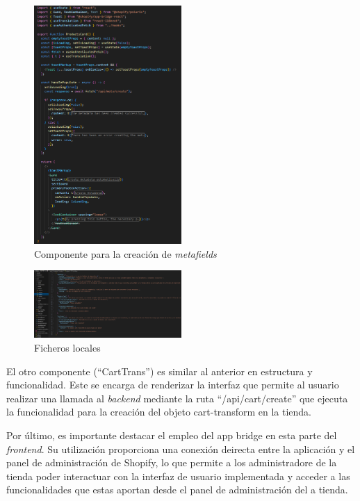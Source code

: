 \documentclass[12pt]{article}
\begin{document}
\begin{figure}[ht]
    \centering
    \includegraphics[width=0.5\textwidth]{imagenes-admin/metafieldComponent.png}
    \caption{\label{fig:componenteMetafield} Componente para la creación de \textit{metafields} }
    \vspace{\fill}
\end{figure}


\begin{figure}[ht]
    \centering
    \includegraphics[width=0.5\textwidth]{imagenes-admin/locales-admin.png}
    \caption{\label{fig:localesAdmin} Ficheros locales }
    \vspace{\fill}
\end{figure}

El otro componente (``CartTrans'') es similar al anterior en estructura y funcionalidad. Este se encarga de renderizar la interfaz que permite al usuario realizar una llamada al \textit{backend} mediante
la ruta ``/api/cart/create'' que ejecuta la funcionalidad para la creación del objeto cart-transform en la tienda.

Por último, es importante destacar el empleo del app bridge en esta parte del \textit{frontend}. Su utilización proporciona una conexión deirecta entre la aplicación y el panel 
de administración de Shopify, lo que permite a los administradore de la tienda poder interactuar con la interfaz de usuario implementada y acceder a las funcionalidades que estas aportan
desde el panel de administración del a tienda.
\end{document}
